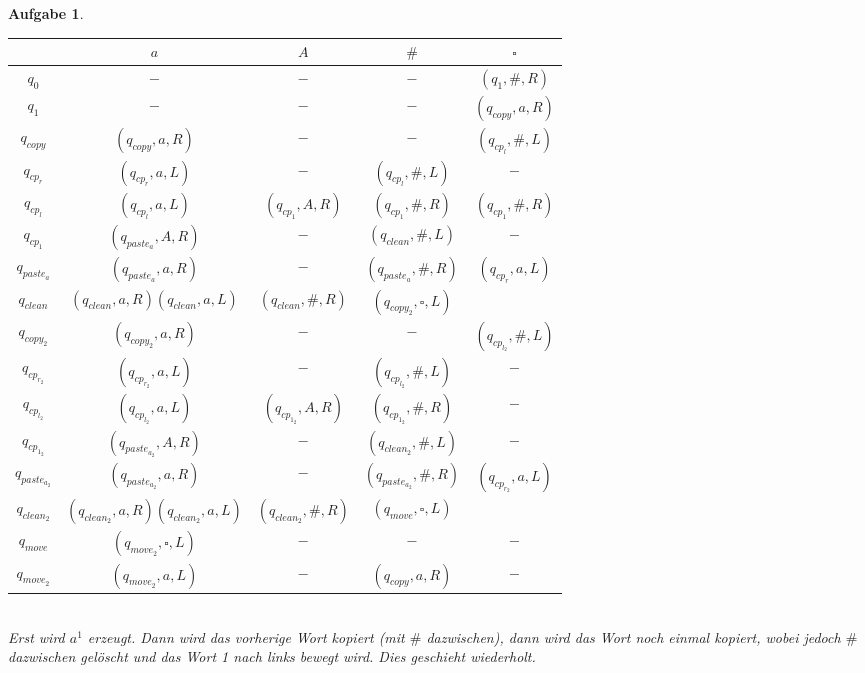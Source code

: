 \documentclass[11pt]{article}
\theoremstyle{break}
\newtheorem{task}{Aufgabe}
\begin{document}
\begin{task}
\begin{enumerate}[label={(\alph*)}]
\begin{tabular}{c|c|c|c|c}
            &$a$&$A$&$\#$&$\square$\\\hline
            $q_0$&$-$&$-$&$-$&$(q_1,\#,R)$\\\hline
            $q_1$&$-$&$-$&$-$&$(q_{copy},a,R)$\\\hline
            $q_{copy}$&$(q_{copy},a,R)$&$-$&$-$&$(q_{cp_l},\#,L)$\\\hline
            $q_{cp_{r}}$&$(q_{cp_{r}},a,L)$&$-$&$(q_{cp_l},\#,L)$&$-$\\\hline
            $q_{cp_l}$&$(q_{cp_l},a,L)$&$(q_{cp_1},A,R)$&$(q_{cp_1},\#,R)$&$(q_{cp_1},\#,R)$\\\hline
            $q_{cp_1}$&$(q_{paste_a},A,R)$&$-$&$(q_{clean},\#,L)$&$-$\\\hline
            $q_{paste_a}$&$(q_{paste_a},a,R)$&$-$&$(q_{paste_a},\#,R)$&$(q_{cp_{r}},a,L)$\\\hline
            $q_{clean}$&$(q_{clean},a,R)$$(q_{clean},a,L)$&$(q_{clean},\#,R)$&$(q_{copy_2},\square,L)$\\\hline

            $q_{copy_2}$&$(q_{copy_2},a,R)$&$-$&$-$&$(q_{cp_{l_2}},\#,L)$\\\hline
            $q_{cp_{r_2}}$&$(q_{cp_{r_2}},a,L)$&$-$&$(q_{cp_{l_2}},\#,L)$&$-$\\\hline
            $q_{cp_{l_2}}$&$(q_{cp_{l_2}},a,L)$&$(q_{cp_{1_2}},A,R)$&$(q_{cp_{1_2}},\#,R)$&$-$\\\hline
            $q_{cp_{1_2}}$&$(q_{paste_{a_2}},A,R)$&$-$&$(q_{clean_2},\#,L)$&$-$\\\hline
            $q_{paste_{a_2}}$&$(q_{paste_{a_2}},a,R)$&$-$&$(q_{paste_{a_2}},\#,R)$&$(q_{cp_{r_2}},a,L)$\\\hline
            $q_{clean_2}$&$(q_{clean_2},a,R)$$(q_{clean_2},a,L)$&$(q_{clean_2},\#,R)$&$(q_{move},\square,L)$\\\hline
            $q_{move}$&$(q_{move_2},\square,L)$&$-$&$-$&$-$\\\hline
            $q_{move_2}$&$(q_{move_2},a,L)$&$-$&$(q_{copy},a,R)$&$-$
        \end{tabular}\vspace{3mm}\\
        Erst wird $a^1$ erzeugt. Dann wird das vorherige Wort kopiert (mit $\#$ dazwischen), dann wird das Wort noch einmal kopiert, wobei jedoch $\#$ dazwischen gelöscht und das Wort 1 nach links bewegt wird. Dies geschieht wiederholt.
    \end{enumerate}
\end{task}
\end{document}
